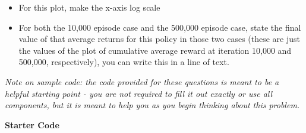 \documentclass[
  letterpaper,
  DIV=11,
  numbers=noendperiod]{scrartcl}
\providecommand{\tightlist}{%
  \setlength{\itemsep}{0pt}\setlength{\parskip}{0pt}}\usepackage{longtable,booktabs,array}
\begin{document}
\begin{itemize}
\tightlist
\item
  For this plot, make the x-axis log scale
\item
  For both the 10,000 episode case and the 500,000 episode case, state
  the final value of that average returns for this policy in those two
  cases (these are just the values of the plot of cumulative average
  reward at iteration 10,000 and 500,000, respectively), you can write
  this in a line of text.
\end{itemize}

\emph{Note on sample code: the code provided for these questions is
meant to be a helpful starting point - you are not required to fill it
out exactly or use all components, but it is meant to help you as you
begin thinking about this problem.}

\textbf{Starter Code}
\end{document}
